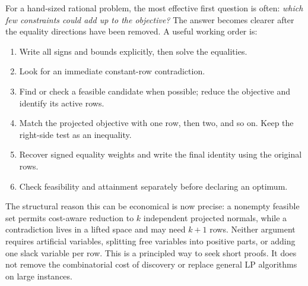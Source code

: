 \documentclass[11pt,letterpaper]{article}
\theoremstyle{definition}
\theoremstyle{remark}
\numberwithin{equation}{section}
\begin{document}
For a hand-sized rational problem, the most effective first question is
often: \emph{which few constraints could add up to the objective?}
The answer becomes clearer after the equality directions have been removed.
A useful working order is:
\begin{enumerate}[label=\arabic*.,leftmargin=*]
\item Write all signs and bounds explicitly, then solve the equalities.
\item Look for an immediate constant-row contradiction.
\item Find or check a feasible candidate when possible; reduce the objective
      and identify its active rows.
\item Match the projected objective with one row, then two, and so on.
      Keep the right-side test as an inequality.
\item Recover signed equality weights and write the final identity using the
      original rows.
\item Check feasibility and attainment separately before declaring an optimum.
\end{enumerate}

The structural reason this can be economical is now precise:
a nonempty feasible set permits cost-aware reduction to \(k\) independent
projected normals, while a contradiction lives in a lifted space and may
need \(k+1\) rows. Neither argument requires artificial variables, splitting
free variables into positive parts, or adding one slack variable per row.
This is a principled way to seek short proofs. It does not remove the
combinatorial cost of discovery or replace general LP algorithms on large
instances.
\end{document}
